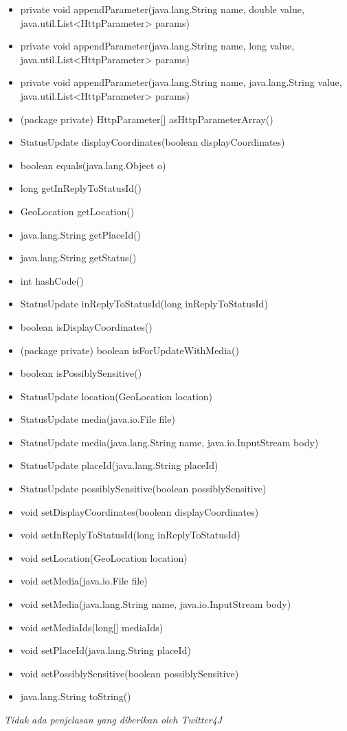 \begin{itemize}
		\begin{itemize}
			\item private void appendParameter(java.lang.String name, double value, java.util.List<HttpParameter> params) 
			\item private void appendParameter(java.lang.String name, long value, java.util.List<HttpParameter> params) 
			\item private void appendParameter(java.lang.String name, java.lang.String value, java.util.List<HttpParameter> params) 
			\item (package private) HttpParameter[] asHttpParameterArray() 
			\item StatusUpdate displayCoordinates(boolean displayCoordinates) 
			\item boolean equals(java.lang.Object o) 
			\item long getInReplyToStatusId() 
			\item GeoLocation getLocation() 
			\item java.lang.String getPlaceId() 
			\item java.lang.String getStatus() 
			\item int hashCode() 
			\item StatusUpdate inReplyToStatusId(long inReplyToStatusId) 
			\item boolean isDisplayCoordinates() 
			\item (package private) boolean isForUpdateWithMedia() 
			\item boolean isPossiblySensitive() 
			\item StatusUpdate location(GeoLocation location) 
			\item StatusUpdate media(java.io.File file) 
			\item StatusUpdate media(java.lang.String name, java.io.InputStream body) 
			\item StatusUpdate placeId(java.lang.String placeId) 
			\item StatusUpdate possiblySensitive(boolean possiblySensitive) 
			\item void setDisplayCoordinates(boolean displayCoordinates) 
			\item void setInReplyToStatusId(long inReplyToStatusId) 
			\item void setLocation(GeoLocation location) 
			\item void setMedia(java.io.File file) 
			\item void setMedia(java.lang.String name, java.io.InputStream body) 
			\item void setMediaIds(long[] mediaIds) 
			\item void setPlaceId(java.lang.String placeId) 
			\item void setPossiblySensitive(boolean possiblySensitive) 
			\item java.lang.String 	toString() 
		\end{itemize}
	\textit{Tidak ada penjelasan yang diberikan oleh Twitter4J}
	\end{itemize}
	
